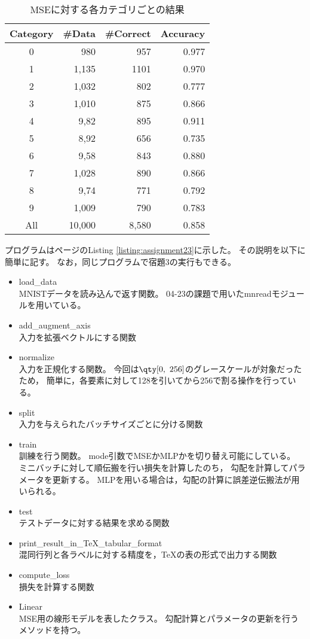 \documentclass[class=jsarticle, crop=false, dvipdfmx, fleqn]{standalone}
\begin{document}
\begin{table}[H]
	\centering
	\caption{MSEに対する各カテゴリごとの結果}
	\begin{tabular}{crrr}
		Category & {\#}Data & {\#}Correct & Accuracy \\ \hline
        0 & 980 & 957 & 0.977 \\
        1 & 1,135 & 1101 & 0.970 \\
        2 & 1,032 & 802 & 0.777 \\
        3 & 1,010 & 875 & 0.866 \\
        4 & 9,82 & 895 & 0.911 \\
        5 & 8,92 & 656 & 0.735 \\
        6 & 9,58 & 843 & 0.880 \\
        7 & 1,028 & 890 & 0.866 \\
        8 & 9,74 & 771 & 0.792 \\
        9 & 1,009 & 790 & 0.783 \\
        All & 10,000 & 8,580 & 0.858 \\
	\end{tabular}
	\label{tab:result_MSE}
\end{table}

プログラムは\pageref{listing:assignment23}ページのListing \ref{listing:assignment23}に示した。
その説明を以下に簡単に記す。
なお，同じプログラムで宿題3の実行もできる。

\begin{itemize}
    \item load\_data \\
        MNISTデータを読み込んで返す関数。
        04-23の課題で用いたmnreadモジュールを用いている。
    \item add\_augment\_axis \\
        入力を拡張ベクトルにする関数
    \item normalize \\
        入力を正規化する関数。
        今回は\(\qty[0,\ 256]\)のグレースケールが対象だったため，
        簡単に，各要素に対して128を引いてから256で割る操作を行っている。
    \item split \\
        入力を与えられたバッチサイズごとに分ける関数
    \item train \\
        訓練を行う関数。
        mode引数でMSEかMLPかを切り替え可能にしている。
        ミニバッチに対して順伝搬を行い損失を計算したのち，
        勾配を計算してパラメータを更新する。
        MLPを用いる場合は，勾配の計算に誤差逆伝搬法が用いられる。
    \item test \\
        テストデータに対する結果を求める関数
    \item print\_result\_in\_TeX\_tabular\_format \\
        混同行列と各ラベルに対する精度を，{\TeX}の表の形式で出力する関数
    \item compute\_loss \\
        損失を計算する関数
    \item Linear \\
        MSE用の線形モデルを表したクラス。
        勾配計算とパラメータの更新を行うメソッドを持つ。
\end{itemize}
\end{document}
